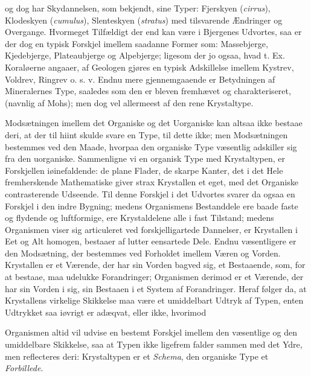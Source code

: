 \documentclass[12pt,a4paper]{book}
\begin{document}
og dog har Skydannelsen, som bekjendt, sine Typer: Fjerskyen
(\textit{cirrus}), Klodeskyen (\textit{cumulus}), Slenteskyen (\textit{stratus})
med tilsvarende Ændringer og Overgange.
Hvormeget Tilfældigt der end kan være i Bjergenes Udvortes, saa er der
dog en typisk Forskjel imellem saadanne Former som: Massebjerge,
Kjedebjerge, Plateaubjerge og Alpebjerge; ligesom der jo ogsaa, hvad
t. Ex. Koraløerne angaaer, af Geologen gjøres
en typisk Adskillelse imellem Kystrev, Voldrev, Ringrev o. s. v. Endnu
mere gjennemgaaende er Betydningen af Mineralernes Type, saaledes som
den er bleven fremhævet og charakteriseret, (navnlig af Mohs); men dog
vel allermeest af den rene Krystaltype.

Modsætningen imellem det Organiske og det Uorganiske kan altsaa ikke
bestaae deri, at der til hiint skulde svare en Type, til dette ikke; men
Modsætningen bestemmes ved den Maade, hvorpaa den organiske Type
væsentlig adskiller sig fra den uorganiske. Sammenligne vi en organisk
Type med Krystaltypen, er Forskjellen iøinefaldende: de plane Flader, de
skarpe Kanter, det i det Hele fremherskende Mathematiske giver strax
Krystallen et eget, med det Organiske contrasterende Udseende. Til denne
Forskjel i det Udvortes svarer da ogsaa en Forskjel i den indre Bygning;
medens Organismens Bestanddele ere baade faste og flydende og
luftformige, ere Krystaldelene alle i fast Tilstand; medens Organismen
viser sig articuleret ved forskjelligartede Dannelser, er Krystallen i
Eet og Alt homogen, bestaaer af lutter eensartede Dele. Endnu
væsentligere er den Modsætning, der bestemmes ved Forholdet imellem
Væren og Vorden. Krystallen er et Værende, der har sin Vorden bagved
sig, et Bestaaende, som, for at bestaae, maa udelukke Forandringer;
Organismen derimod er et Værende, der har sin Vorden i sig, sin Bestaaen
i et System af Forandringer. Heraf følger da, at Krystallens virkelige
Skikkelse maa være et umiddelbart Udtryk af Typen, enten Udtrykket saa
iøvrigt er adæqvat, eller ikke, hvorimod

\setcounter{footnote}{0}
Organismen altid vil udvise en bestemt Forskjel imellem den væsentlige og
den umiddelbare Skikkelse, saa at Typen ikke ligefrem falder sammen med
det Ydre, men reflecteres deri: Krystaltypen er et \emph{Schema}, den
organiske Type et \emph{Forbillede}.
\end{document}
